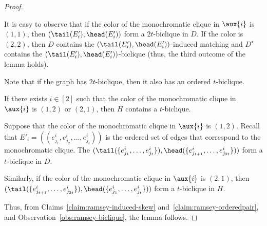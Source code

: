 \begin{proof}
\begin{observation}\label{obs:ramsey-biclique}
It is easy to observe that if the color of the monochromatic clique in $\aux{i}$ is $(1,1)$, then $(\tail(E'_i),\head(E'_i))$ form a $2t$-biclique in $D$. If the color is $(2,2)$, then $D$ contains the $(\tail(E'_i),\head(E'_i))$-induced matching and $D^{\star}$ contains the $(\tail(E'_i),\head(E'_i))$-biclique (thus, the third outcome of the lemma holds). 
\end{observation}

Note that if the graph has $2t$-biclique, then it also has an ordered $t$-biclique.

\begin{claim}\label{claim:ramsey-induced-skew}
If there exists $i \in [2]$ such that the color of the monochromatic clique in $\aux{i}$ is $(1,2)$ or $(2,1)$, then $H$ contains a $t$-biclique.
\end{claim}

\begin{claimproof}
Suppose that the color of the monochromatic clique in $\aux{i}$ is $(1,2)$. Recall that $E'_i =((e^i_{j_1}, e^i_{j_2}, \ldots , e^i_{j_{t}}))$ is the ordered set of edges that correspond to the monochromatic clique. The $(\tail(\{e^i_{j_1}, \ldots , \allowbreak e^i_{j_{t}}\}), \allowbreak \head(\{e^i_{j_{t +1 }}, \ldots, \allowbreak e^i_{j_{2t}}\}))$ form a $t$-biclique in $D$.

Similarly, if the color of the monochromatic clique in $\aux{i}$ is $(2,1)$, then $(\tail(\{e^i_{j_{t+1}}, \ldots, \allowbreak e^i_{j_{2t}}\}), \allowbreak  \head(\{e^i_{j_1}, \ldots, \allowbreak e^i_{j_{t}}\}))$ form a $t$-biclique in $H$.
\end{claimproof}

Thus, from Claims~\ref{claim:ramsey-induced-skew} and~\ref{claim:ramsey-orderedpair}, and Observation~\ref{obs:ramsey-biclique}, the lemma follows.
\end{proof}